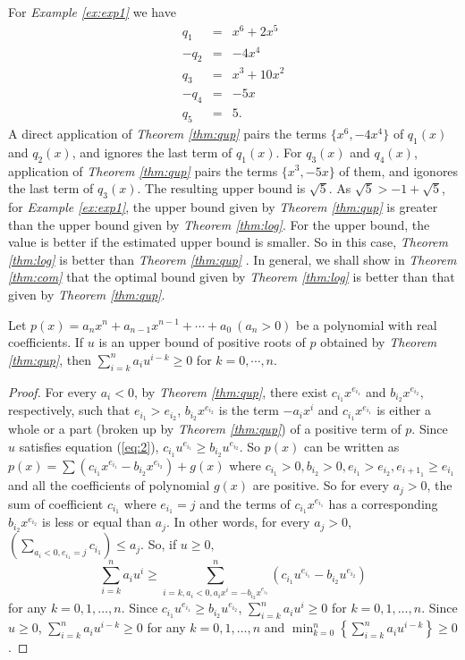 For {\em Example \ref{ex:exp1}} we have
  \begin{eqnarray*}
 q_1&=&x^6+2x^5\\  	
 -q_2&=& -4x^4\\
 q_3&=& x^3+10x^2\\
 -q_4&=& -5x\\
 q_5&=&5.
  	\end{eqnarray*}
A direct application of {\em Theorem \ref{thm:qup}} pairs the terms $\{x^6, -4x^4\}$ of $q_1(x)$ and $q_2(x)$, and ignores the last term
  	of $q_1(x)$. For $q_3(x)$ and $q_4(x)$,   application of {\em Theorem \ref{thm:qup}} pairs the terms $\{x^3, -5x\}$ of them, and igonores the last  term of $q_3(x)$. The resulting upper bound is $\sqrt{5}$. As $\sqrt{5}> -1+\sqrt{5}$, for {\em Example \ref{ex:exp1}}, the upper bound given by {\em Theorem \ref{thm:qup}} is greater than  the upper bound given by {\em Theorem \ref{thm:log}}. For the upper bound, the value is better if the estimated upper bound is smaller. So in this case,  {\em Theorem \ref{thm:log}}  is better than   {\em Theorem \ref{thm:qup}} . In general, we shall show in {\em Theorem \ref{thm:com}} that the optimal bound given by {\em Theorem \ref{thm:log}} is better than that given by {\em Theorem \ref{thm:qup}}.

\begin{theorem}\label{thm:com}
	Let $p(x)=a_nx^n+a_{n-1}x^{n-1}+\cdots+a_0\ (a_n>0)$ be a polynomial with real coefficients. If $u$ is an upper bound of positive roots of $p$ obtained by {\em Theorem \ref{thm:qup}}, then $  \sum_{i=k}^n a_i u^{i-k}\ge0$ for $k=0,\cdots, n$.
	
\end{theorem}
\begin{proof}

	For every $ a_i<0$, by {\em Theorem \ref{thm:qup}}, there exist  $c_{i_1}x^{e_{i_1}}$ and $b_{i_2}x^{e_{i_2}},$  respectively, such that
	$e_{i_1}>e_{i_2}$, $b_{i_2}x^{e_{i_2} }$ is the term $-a_ix^i$
	and $c_{i_1}x^{e_{i_1} }$ is either a whole or a part (broken up by {\em Theorem \ref{thm:qup}}) of a positive term of $p$. Since $u$ satisfies equation (\ref{eq:2}),
	 $c_{i_1}u^{e_{i_1}}\ge b_{i_2}u^{e_{i_2}}$.
So $p(x)$ can be written as $p(x)=\sum (c_{i_1}x^{e_{i_1}}-b_{i_2}x^{e_{i_2}})+g(x)$ where $c_{i_1}> 0,b_{i_2}>0,e_{i_1}> e_{i_2}, e_{{i+1}_1}\ge e_{i_1} $  and all the coefficients of polynomial $g(x)$ are positive.
	 So for  every  $a_j>0$, the sum of coefficient $c_{i_1}$ where  $e_{i_1}=j$ and  the terms of $c_{i_1}x^{e_{i_1}}$    has a corresponding $ b_{i_2}x^{e_{i_2}}$ is less or equal than $a_j$. In other words,
	for every  $a_j>0$,   $\left( \sum_{a_i<0,e_{i_1}=j }c_{i_1} \right)\le a_{j}$. So, if $u\ge0,$
	\[\sum_{i=k}^na_iu^i\ge \sum_{i=k,a_i<0, a_ix^i=-b_{i_2}x^{e_{i_2}}  }^n \left( c_{i_1}u^{e_{i_1}}-
		b_{i_2}u^{e_{i_2}} \right) \] for any $k= 0,1,\ldots,n$.  Since  $c_{i_1}u^{e_{i_1}}\ge b_{i_2}u^{e_{i_2}}$, $\sum_{i=k}^na_iu^i\ge 0$ for
	 $k= 0,1,\ldots,n$. Since $u\ge0$,  $\sum_{i=k}^n a_i u^{i-k}\ge0 $ for any  $k= 0,1,\ldots,n$ and
	$\min_{k=0}^{n}\left\{  \sum_{i=k}^n a_i u^{i-k}\right\}\ge0$.
\end{proof}


